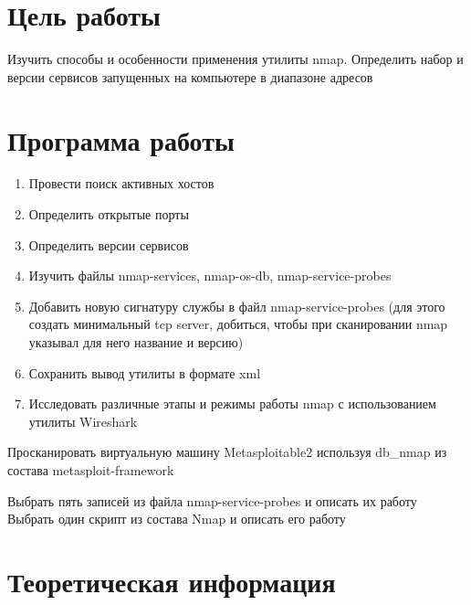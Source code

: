 \documentclass[a4paper]{article}
\begin{document}
\vfill %


\tableofcontents
\newpage



\section{Цель работы}

Изучить способы и особенности применения утилиты nmap. Определить набор и версии сервисов запущенных на компьютере в диапазоне адресов

\section{Программа работы}

\begin{enumerate}

\item Провести поиск активных хостов

\item Определить открытые порты

\item Определить версии сервисов

\item Изучить файлы nmap-services, nmap-os-db, nmap-service-probes

\item Добавить новую сигнатуру службы в файл nmap-service-probes (для этого создать минимальный tcp server, добиться, чтобы при сканировании nmap указывал для него название и версию)

\item Сохранить вывод утилиты в формате xml

\item Исследовать различные этапы и режимы работы nmap с использованием утилиты Wireshark

\end{enumerate}

Просканировать виртуальную машину Metasploitable2 используя db\_nmap из состава metasploit-framework

Выбрать пять записей из файла nmap-service-probes и описать их работу Выбрать один скрипт из состава Nmap и описать его работу

\section{Теоретическая информация}
\end{document}
